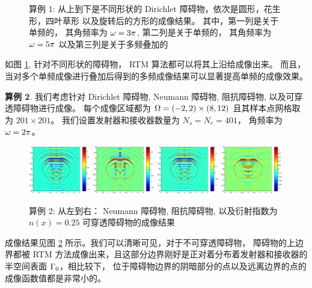 {\begin{figure}[htbp]
	\caption{算例 1: 从上到下是不同形状的 Dirichlet 障碍物，依次是圆形，花生形，四叶草形 以及旋转后的方形的成像结果。 其中，第一列是关于单频的， 其角频率为 $\omega=3\pi$, 第二列是关于单频的， 其角频率为 $\omega=5\pi$ 以及第三列是关于多频叠加的}\label{figure_21}
\end{figure}
如图 \ref{figure_21}, 针对不同形状的障碍物， RTM 算法都可以将其上沿给成像出来。 而且， 当对多个单频成像进行叠加后得到的多频成像结果可以显著提高单频的成像效果。

\bigskip
\textbf{算例 2}.
我们考虑针对 Dirichlet 障碍物,  Neumann 障碍物, 阻抗障碍物, 以及可穿透障碍物进行成像。 每个成像区域都为 $\Omega=(-2,2) \times (8, 12)$ 且其样本点网格取为 $201 \times 201$。 我们设置发射器和接收器数量为 $N_s = N_r = 401$， 角频率为 $\omega=2\pi$。 
\begin{figure}[htbp]
	\centering
	\includegraphics[width=0.24\textwidth]{./Img/graphic/peanut_3pi.eps}
	\includegraphics[width=0.24\textwidth]{./Img/graphic/peanut_3pi_neumann.eps}
	\includegraphics[width=0.24\textwidth]{./Img/graphic/peanut_3pi_impedance_1.eps}
	\includegraphics[width=0.24\textwidth]{./Img/graphic/peanut_3pi_transmission.eps}
	\caption{算例 2: 从左到右： Neumann 障碍物, 阻抗障碍物, 以及衍射指数为$n(x)=0.25$
		可穿透障碍物的成像结果} \label{figure_11}
\end{figure}

成像结果见图 \ref{figure_11} 所示。我们可以清晰可见，对于不可穿透障碍物， 障碍物的上边界都被 RTM 方法成像出来，且这部分边界刚好是正对着分布着发射器和接收器的半空间表面 $\Gamma_0$，相比较下， 位于障碍物边界的阴暗部分的点以及远离边界的点的成像函数值都是非常小的。

}
